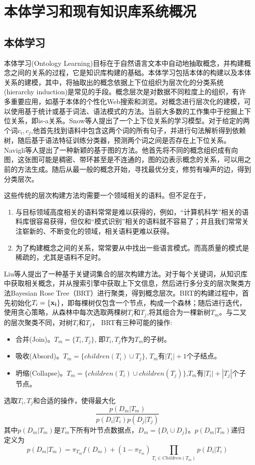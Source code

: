 \section{本体学习和现有知识库系统概况}
\subsection{本体学习}
本体学习(Ontology Learning)目标在于自然语言文本中自动地抽取概念，并构建概念之间的关系的过程，它是知识库构建的基础。本体学习包括本体的构建以及本体关系的建模，其中，将抽取出的概念依据上下位组织为层次化的分类系统(hierarchy induction)是常见的手段。概念层次是对数据不同粒度上的组织，有许多重要应用，如基于本体的个性化Web搜索和浏览\cite{gauch2003ontology}。对概念进行层次化的建模，可以使用基于统计或基于词法、语法模式的方法。当前大多数的工作集中于挖掘上下位关系，即is-a关系。Snow等人\cite{snow2004learning}提出了一个上下位关系的学习模型。对于给定的两个词$c_i,c_j$,他首先找到语料中包含这两个词的所有句子，并进行句法解析得到依赖树，随后基于语法特征训练分类器，预测两个词之间是否存在上下位关系。Navigli等人\cite{navigli2011graph}提出了一种新颖的基于图的方法。他首先将不同的概念组织成有向图，这张图可能是稠密、带环甚至是不连通的，图的边表示概念的关系，可以用之前的方法生成。随后从最一般的概念开始，寻找最优分支，修剪有噪声的边，得到分类层次。

这些传统的层次构建方法均需要一个领域相关的语料。但不足在于，
\begin{enumerate}
\item 与目标领域高度相关的语料常常是难以获得的，例如，``计算机科学''相关的语料库很容易获得，但仅和``模式识别''相关的语料就不容易了；并且我们常常关注崭新的、不断变化的领域，相关语料更难以获得。
\item 为了构建概念之间的关系，常常要从中找出一些语言模式。而高质量的模式是稀疏的，尤其是语料不足时。
\end{enumerate}

Liu等人\cite{liu2012automatic}提出了一种基于关键词集合的层次构建方法。对于每个关键词，从知识库中获取相关概念，并从搜索引擎中获取上下文信息，然后进行多分支的层次聚类方法Bayesian Rose Tree（BRT）进行聚类，得到概念层次。BRT的构建过程中，首先初始化$T_i=\{\bf{x}_i\}$，即每棵树仅包含一个节点，构成一个森林；随后进行迭代，使用贪心策略，从森林中每次选取两棵树$T_i$和$T_j$,将其组合为一棵新树$T_m$。与二叉的层次聚类不同，对树$T_i$和$T_j$， BRT有三种可能的操作:
\begin{itemize}
\item 合并(Join)。$T_m=\{T_i, T_j\}$, 即$T_i, T_j$作为$T_m$的子树。
\item 吸收(Absord)。$T_m  = \{children(T_i) \cup T_j\}$, $T_m$有$|T_i|+1$个子结点。
\item 坍缩(Collapse)。$T_m = \{children(T_i)\cup children(T_j)\}$,$T_m$有$|T_i|+|T_j|$个子节点。
\end{itemize}
选取$T_i, T_j$和合适的操作，使得最大化
\[
\frac{p(D_m|T_m)}{p(D_i|T_i)p(D_j|T_j)}
\]
其中$p(D_m|T_m)$是$T_m$下所有叶节点数据点，$D_m=\{ D_i\cup D_j\}$。$p(D_m|T_m)$递归定义为
\[
p(D_m|T_m) = \pi_{T_m}f(D_m)+(1-\pi_{T_m}) \prod \limits_{{T_i} \in Children({T_m})} {p({D_i}|{T_i})} 
\]

